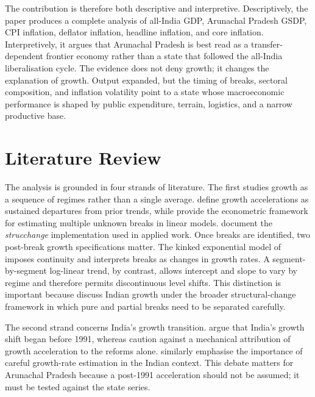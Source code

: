 \documentclass[11pt,a4paper]{article}
\begin{document}
The contribution is therefore both descriptive and interpretive. Descriptively, the paper produces a complete analysis of all-India GDP, Arunachal Pradesh GSDP, CPI inflation, deflator inflation, headline inflation, and core inflation. Interpretively, it argues that Arunachal Pradesh is best read as a transfer-dependent frontier economy rather than a state that followed the all-India liberalisation cycle. The evidence does not deny growth; it changes the explanation of growth. Output expanded, but the timing of breaks, sectoral composition, and inflation volatility point to a state whose macroeconomic performance is shaped by public expenditure, terrain, logistics, and a narrow productive base.

\section{Literature Review}

The analysis is grounded in four strands of literature. The first studies growth as a sequence of regimes rather than a single average. \citet{hausmann_pritchett_rodrik_2004} define growth accelerations as sustained departures from prior trends, while \citet{bai_perron_1998,bai_perron_2003} provide the econometric framework for estimating multiple unknown breaks in linear models. \citet{zeileis_leisch_hornik_kleiber_2002} document the \textit{strucchange} implementation used in applied work. Once breaks are identified, two post-break growth specifications matter. The kinked exponential model of \citet{boyce_1986} imposes continuity and interprets breaks as changes in growth rates. A segment-by-segment log-linear trend, by contrast, allows intercept and slope to vary by regime and therefore permits discontinuous level shifts. This distinction is important because \citet{balakrishnan_parameswaran_2007} discuss Indian growth under the broader structural-change framework in which pure and partial breaks need to be separated carefully.

The second strand concerns India's growth transition. \citet{rodrik_subramanian_2005} argue that India's growth shift began before 1991, whereas \citet{agarwal_whalley_2013} caution against a mechanical attribution of growth acceleration to the reforms alone. \citet{balakrishnan_parameswaran_2007} similarly emphasise the importance of careful growth-rate estimation in the Indian context. This debate matters for Arunachal Pradesh because a post-1991 acceleration should not be assumed; it must be tested against the state series.
\end{document}
